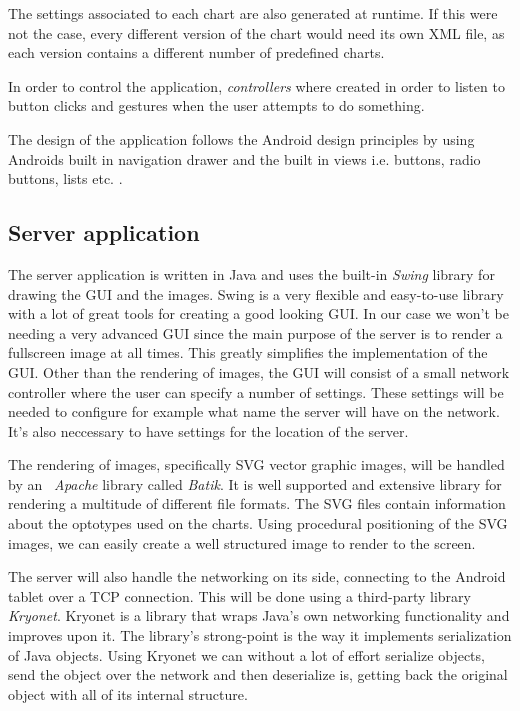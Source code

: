 \documentclass[12pt,a4paper,notitlepage]{report}
\begin{document}
The settings associated to each chart are also generated at runtime. If this were not the case, every different version of the chart would need its own XML file, as each version contains a different number of predefined charts.

In order to control the application, \textit{controllers} where created in order to listen to button clicks and gestures when the user attempts to do something.

The design of the application follows the Android design principles by using Androids built in navigation drawer and the built in views i.e. buttons, radio buttons, lists etc. \cite{android_design}.

\subsection{Server application}
The server application is written in Java and uses the built-in \textit{Swing} library for drawing the GUI and the images. Swing is a very flexible and easy-to-use library with a lot of great tools for creating a good looking GUI. In our case
we won't be needing a very advanced GUI since the main purpose of the server is to render a fullscreen image at all times. This greatly simplifies the implementation of the GUI. Other than the rendering of images, the GUI will consist of a small network controller where the user can specify a number of settings. These settings will be needed to configure for example what name the server will have on the network. It's also neccessary to have settings for the location of the server.

The rendering of images, specifically SVG vector graphic images, will be handled by an \textit{~Apache} library called \textit{Batik}. It is well supported and extensive library for rendering a multitude of different file formats. The SVG files contain information about the optotypes used on the charts. Using procedural positioning of the SVG images, we can easily create a well structured image to render to the screen.

The server will also handle the networking on its side, connecting to the Android tablet over a TCP connection. This will be done using a third-party library \textit{Kryonet}. \cite{kryonet} Kryonet is a library that wraps Java's own networking functionality and improves upon it. The library's strong-point is the way it implements serialization of Java objects. Using Kryonet we can without a lot of effort serialize objects, send the object over the network and then deserialize is, getting back the original object with all of its internal structure. 
\end{document}
